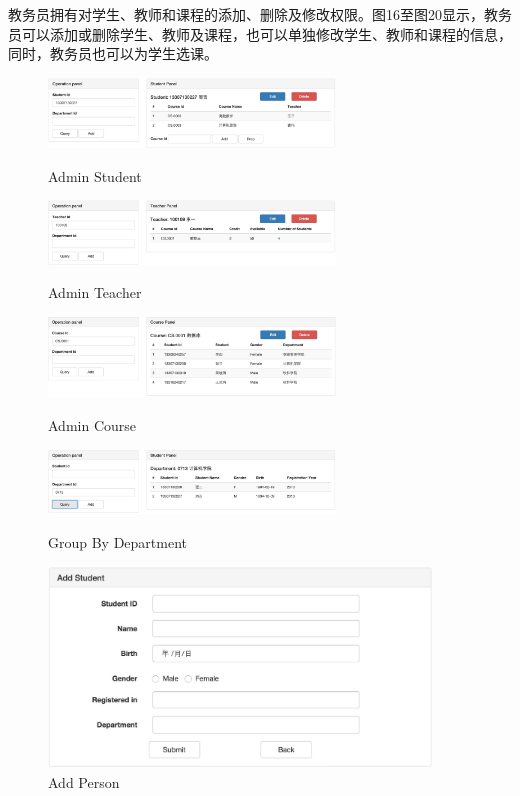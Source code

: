 \documentclass[a4paper, 11pt, nofonts, nocap, fancyhdr]{ctexart}
\begin{document}
	教务员拥有对学生、教师和课程的添加、删除及修改权限。图16至图20显示，教务员可以添加或删除学生、教师及课程，也可以单独修改学生、教师和课程的信息，同时，教务员也可以为学生选课。

	\begin{figure}[h]
		\begin{minipage}{0.5\textwidth}
			\centering
			\includegraphics[width=3in]{adstu}
			\caption{Admin Student}
		\end{minipage}%
		\begin{minipage}{0.5\textwidth}
			\centering
			\includegraphics[width=3in]{adtea}
			\caption{Admin Teacher}
		\end{minipage}

			\vspace{0.8cm}

		\begin{minipage}{0.5\textwidth}
			\centering
			\includegraphics[width=3in]{adcou}
			\caption{Admin Course}
		\end{minipage}%
		\begin{minipage}{0.5\textwidth}
			\centering
			\includegraphics[width=3in]{addep}
			\caption{Group By Department}
		\end{minipage}

			\vspace{0.8cm}

		\centering
		\includegraphics[width=4in]{adadd}
		\caption{Add Person}
	\end{figure}
\end{document}
